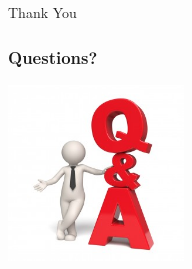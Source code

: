 \documentclass[10pt]{beamer}
\begin{document}
\begin{frame}
  \begin{center}
    \Huge{Thank You}
  \end{center}
\end{frame}

\begin{frame}
	\frametitle{Questions?}
	\begin{center}
	\includegraphics[width=0.35\textwidth]{q2.jpg}
	\end{center}
\end{frame}

\end{document}
